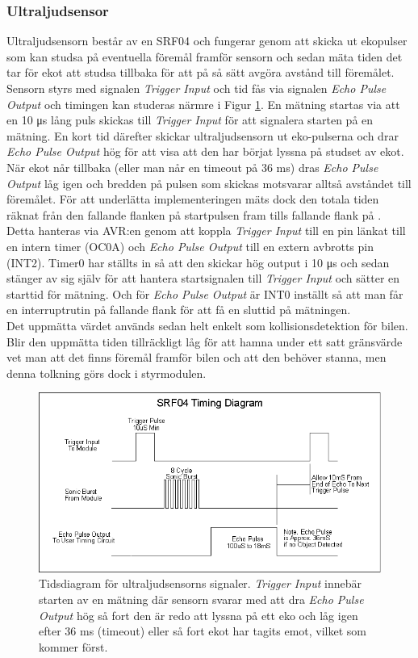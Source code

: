 \documentclass[10pt,oneside,swedish]{lips}
\begin{document}
\subsubsection{Ultraljudsensor}
Ultraljudsensorn består av en SRF04 och fungerar genom att skicka ut ekopulser som kan studsa på eventuella föremål framför sensorn och sedan mäta tiden det tar för ekot att studsa tillbaka för att på så sätt avgöra avstånd till föremålet. \\ %
\noindent
Sensorn styrs med signalen \emph{Trigger Input} och tid fås via signalen \emph{Echo Pulse Output} och timingen kan studeras närmre i Figur \ref{fig:us-timing}. En mätning startas via att en 10 μs lång puls skickas till \emph{Trigger Input} för att signalera starten på en mätning. En kort tid därefter skickar ultraljudsensorn ut eko-pulserna och drar \emph{Echo Pulse Output} hög för att visa att den har börjat lyssna på studset av ekot. När ekot når tillbaka (eller man når en timeout på 36 ms) dras \emph{Echo Pulse Output} låg igen och bredden på pulsen som skickas motsvarar alltså avståndet till föremålet. För att underlätta implementeringen mäts dock den totala tiden räknat från den fallande flanken på startpulsen fram tills fallande flank på . \\

\noindent
Detta hanteras via AVR:en genom att koppla \emph{Trigger Input} till en pin länkat till en intern timer (OC0A) och \emph{Echo Pulse Output} till en extern avbrotts pin (INT2). Timer0 har ställts in så att den skickar hög output i 10 μs och sedan stänger av sig själv för att hantera startsignalen till \emph{Trigger Input} och sätter en starttid för mätning. Och för \emph{Echo Pulse Output} är INT0 inställt så att man får en interruptrutin på fallande flank för att få en sluttid på mätningen. \\

\noindent
Det uppmätta värdet används sedan helt enkelt som kollisionsdetektion för bilen. Blir den uppmätta tiden tillräckligt låg för att hamna under ett satt gränsvärde vet man att det finns föremål framför bilen och att den behöver stanna, men denna tolkning görs dock i styrmodulen.

\begin{figure}[H]
  \centering
  \includegraphics[width=.60\textwidth]{./Figures/srf04timing.png}
  \caption{Tidsdiagram för ultraljudsensorns signaler. \emph{Trigger Input} innebär starten av en mätning där sensorn svarar med att dra \emph{Echo Pulse Output} hög så fort den är redo att lyssna på ett eko och låg igen efter 36 ms (timeout) eller så fort ekot har tagits emot, vilket som kommer först.}
  \label{fig:us-timing}
\end{figure}
\end{document}

